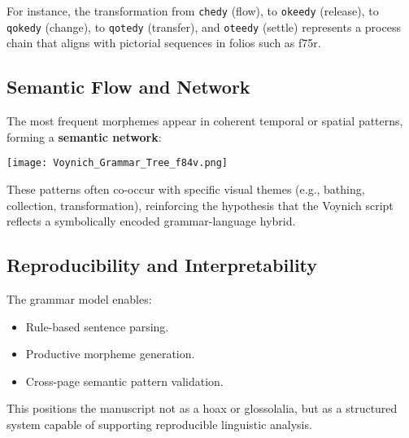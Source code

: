 \documentclass{article}
\begin{document}
For instance, the transformation from \texttt{chedy} (flow), to \texttt{okeedy} (release), to \texttt{qokedy} (change), to \texttt{qotedy} (transfer), and \texttt{oteedy} (settle) represents a process chain that aligns with pictorial sequences in folios such as f75r.

\subsection{Semantic Flow and Network}

The most frequent morphemes appear in coherent temporal or spatial patterns, forming a \textbf{semantic network}:

\begin{center}
\texttt{[image: Voynich\_Grammar\_Tree\_f84v.png]}
\end{center}

These patterns often co-occur with specific visual themes (e.g., bathing, collection, transformation), reinforcing the hypothesis that the Voynich script reflects a symbolically encoded grammar-language hybrid.

\subsection{Reproducibility and Interpretability}

The grammar model enables:
\begin{itemize}
    \item Rule-based sentence parsing.
    \item Productive morpheme generation.
    \item Cross-page semantic pattern validation.
\end{itemize}

This positions the manuscript not as a hoax or glossolalia, but as a structured system capable of supporting reproducible linguistic analysis.


\end{document}
